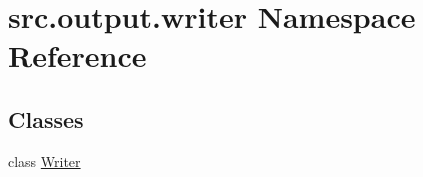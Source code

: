 \hypertarget{namespacesrc_1_1output_1_1writer}{\section{src.\+output.\+writer Namespace Reference}
\label{namespacesrc_1_1output_1_1writer}
}
\subsection*{Classes}
\begin{DoxyCompactItemize}
\item 
class \hyperlink{classsrc_1_1output_1_1writer_1_1_writer}{Writer}
\end{DoxyCompactItemize}
